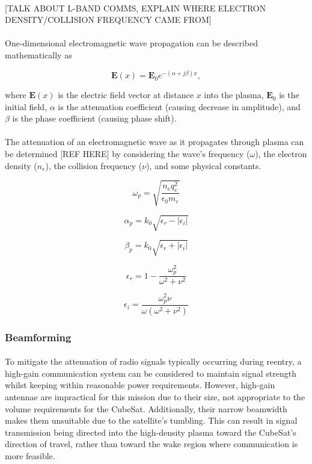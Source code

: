 \documentclass[11pt]{article}
\begin{document}
	\paragraph{}[TALK ABOUT L-BAND COMMS, EXPLAIN WHERE ELECTRON DENSITY/COLLISION FREQUENCY CAME FROM]
	
	\paragraph{}One-dimensional electromagnetic wave propagation can be described mathematically as
	
	\[
	\mathbf{E}(x) = \mathbf{E}_0 e^{-(\alpha + j\beta)x},
	\]
	
	
	
	where \( \mathbf{E}(x) \) is the electric field vector at distance \( x \) into the plasma, \( \mathbf{E}_0 \) is the initial field, \( \alpha \) is the attenuation coefficient (causing decrease in amplitude), and \( \beta \) is the phase coefficient (causing phase shift).
	
	
	\paragraph{}The attenuation of an electromagnetic wave as it propagates through plasma can be determined [REF HERE] by considering the wave's frequency ($\omega$), the electron density ($n_e$), the collision frequency ($\nu$), and some physical constants.

	\[\omega_p = \sqrt{\frac{n_e q_e^2}{\epsilon_0 m_e}}\]	
	
	\[\alpha_p = k_0 \sqrt{\epsilon_r - |\epsilon_i|}\]
	
	\[\beta_p = k_0 \sqrt{\epsilon_r + |\epsilon_i|}\]
	
	\[\epsilon_r = 1 - \frac{\omega_p^2}{\omega^2 + \nu^2}\]
	
	\[\epsilon_i = \frac{\omega_p^2 \nu}{\omega (\omega^2 + \nu^2)}\]
	
	\subsubsection{Beamforming}
	
	\paragraph{} To mitigate the attenuation of radio signals typically occurring  during reentry, a high-gain communication system can be considered to maintain signal strength whilst keeping within reasonable power requirements. However, high-gain antennae are impractical for this mission due to their size, not appropriate to the volume requirements for the CubeSat. Additionally, their narrow beamwidth makes them unsuitable due to the satellite's tumbling. This can result in signal transmission being directed into the high-density plasma toward the CubeSat's direction of travel, rather than toward the wake region where communication is more feasible.
	
\end{document}
